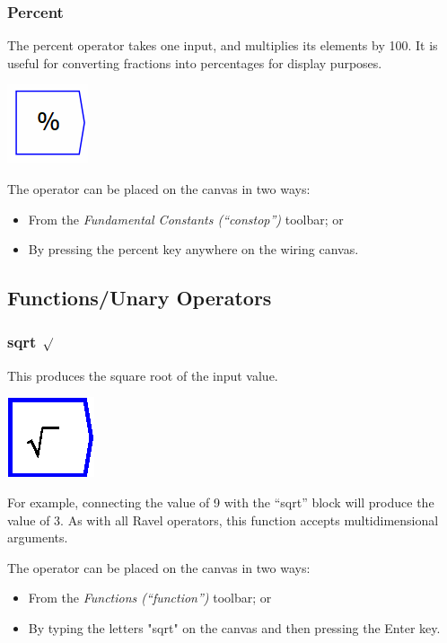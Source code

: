 \subsubsection{Percent}

\label{Operation:percent} The percent operator takes one input, and
multiplies its elements by 100. It is useful for converting fractions
into percentages for display purposes.

\includegraphics{images/PercentOperator}

The operator can be placed on the canvas in two ways:
\begin{itemize}
\item From the \emph{Fundamental Constants (``constop'')} toolbar; or 
\item By pressing the percent key anywhere on the wiring canvas. 
\end{itemize}

\subsection{Functions/Unary Operators}

\label{Functions/Unary-Operators}

\subsubsection{sqrt $\protect\surd$}

\label{Operation:sqrt} This produces the square root of the input
value.

\includegraphics{images/squareRoot}

For example, connecting the value of 9 with the ``sqrt'' block will
produce the value of 3. As with all Ravel operators, this function
accepts multidimensional arguments.

The operator can be placed on the canvas in two ways:
\begin{itemize}
\item From the \emph{Functions (``function'')} toolbar; or 
\item By typing the letters "sqrt" on the canvas and then pressing the
Enter key. 
\end{itemize}

